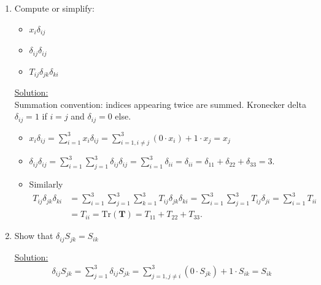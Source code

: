 \documentclass{article}
\newcommand{\bi}{\begin{itemize}}
\newcommand{\ei}{\end{itemize}}
\newcommand{\bs}{\boldsymbol}
\begin{document}
\begin{enumerate}
\newpage
\item Compute or simplify:
\bi
\item $x_i \delta_{ij}$
\item $\delta_{ij}\delta_{ij}$
\item $T_{ij}\delta_{jk}\delta_{ki}$
\ei
%

\underline{Solution:} \\
 Summation convention: indices appearing twice are summed. Kronecker delta $\delta_{ij} = 1$ if $i = j$ and
 $\delta_{ij} = 0$ else.
\bi
\item $x_i \delta_{ij} = \sum_{i = 1}^3 x_i \delta_{ij} = \sum_{i = 1, i \neq j}^3 (0\cdot x_i) + 1\cdot x_j = x_j$
\item $\delta_{ij}\delta_{ij}=\sum_{i=1}^3 \sum_{j=1}^3 \delta_{ij}\delta_{ij}=\sum_{i=1}^3 \delta_{ii}=\delta_{ii}=\delta_{11}+\delta_{22}+\delta_{33}=3$.
\item Similarly
\begin{align}
T_{ij}\delta_{jk}\delta_{ki} &= \sum_{i=1}^3\sum_{j=1}^3 \sum_{k=1}^3 T_{ij}\delta_{jk}\delta_{ki}=\sum_{i=1}^3\sum_{j=1}^3  T_{ij}\delta_{ji} = \sum_{i=1}^3
T_{ii} \\ \nonumber
&= T_{ii} = \textrm{Tr}(\bs T) = T_{11}+T_{22}+T_{33}.
\end{align}
\ei

\item Show that $\delta_{ij} S_{jk} = S_{ik}$

\underline{Solution:}\\
\begin{align}
\delta_{ij} S_{jk} = \sum_{j = 1}^3 \delta_{ij}S_{jk} = \sum_{j = 1, j\neq i}^3(0\cdot S_{jk}) + 1\cdot S_{ik} =
S_{ik}
\end{align}


\end{enumerate}
\end{document}
